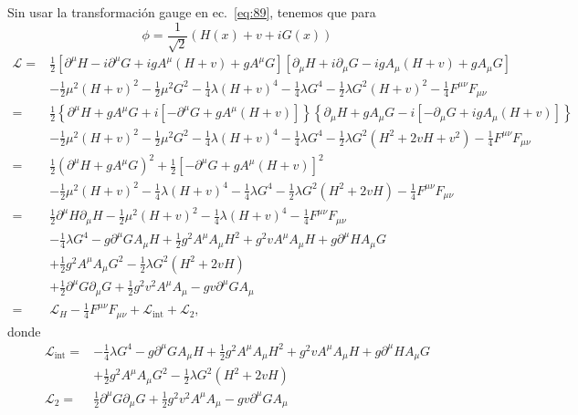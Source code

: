 Sin usar la transformaci\'on gauge en ec.~\eqref{eq:89}, tenemos que para
\begin{equation}
  \phi=\frac{1}{\sqrt{2}}\left(H(x)+v+iG(x)\right)
\end{equation}
\begin{align}
  \mathcal{L}=&\tfrac{1}{2}\left[\partial^\mu H-i\partial^\mu G+igA^\mu(H+v)+gA^\mu G\right]\left[\partial_\mu H+i\partial_\mu G-igA_\mu(H+v)+gA_\mu G\right]\nonumber\\
&-\tfrac{1}{2}\mu^2(H+v)^2-\tfrac{1}{2}\mu^2G^2-\tfrac{1}{4}\lambda(H+v)^4-\tfrac{1}{4}\lambda G^4-\tfrac{1}{2}\lambda G^2(H+v)^2-\tfrac{1}{4}F^{\mu\nu}F_{\mu\nu}\nonumber\\
=&\tfrac{1}{2}\left\{\partial^\mu H+gA^\mu G+i\left[-\partial^\mu G+gA^\mu(H+v)\right]\right\}\left\{\partial_\mu H+gA_\mu G-i\left[-\partial_\mu G+igA_\mu(H+v)\right]\right\}\nonumber\\
&-\tfrac{1}{2}\mu^2(H+v)^2-\tfrac{1}{2}\mu^2G^2-\tfrac{1}{4}\lambda(H+v)^4-\tfrac{1}{4}\lambda G^4-\tfrac{1}{2}\lambda G^2(H^2+2vH+v^2)-\tfrac{1}{4}F^{\mu\nu}F_{\mu\nu}\nonumber\\
=&\tfrac{1}{2}\left(\partial^\mu H+gA^\mu G\right)^2+\tfrac{1}{2}\left[-\partial^\mu G+gA^\mu(H+v)\right]^2\nonumber\\
&-\tfrac{1}{2}\mu^2(H+v)^2-\tfrac{1}{4}\lambda(H+v)^4-\tfrac{1}{4}\lambda G^4-\tfrac{1}{2}\lambda G^2(H^2+2vH)-\tfrac{1}{4}F^{\mu\nu}F_{\mu\nu}\nonumber\\
=&\tfrac{1}{2}\partial^\mu H\partial_\mu H-\tfrac{1}{2}\mu^2(H+v)^2-\tfrac{1}{4}\lambda(H+v)^4-\tfrac{1}{4}F^{\mu\nu}F_{\mu\nu}\nonumber\\
&-\tfrac{1}{4}\lambda G^4-g\partial^\mu GA_\mu H+\tfrac{1}{2}g^2A^\mu A_\mu H^2+g^2vA^\mu A_\mu H+g\partial^\mu HA_\mu G\nonumber\\
&+\tfrac{1}{2}g^2A^\mu A_\mu G^2-\tfrac{1}{2}\lambda G^2(H^2+2vH)\nonumber\\
&+\tfrac{1}{2}\partial^\mu G\partial_\mu G+\tfrac{1}{2}g^2v^2A^\mu A_\mu-gv\partial^\mu GA_\mu\nonumber\\
=&\mathcal{L}_H-\tfrac{1}{4}F^{\mu\nu}F_{\mu\nu}+\mathcal{L}_{\text{int}}+\mathcal{L}_2,
\end{align}
donde
\begin{align}
\mathcal{L}_{\text{int}}=&-\tfrac{1}{4}\lambda G^4-g\partial^\mu GA_\mu H+\tfrac{1}{2}g^2A^\mu A_\mu H^2+g^2vA^\mu A_\mu H+g\partial^\mu HA_\mu G\nonumber\\
&+\tfrac{1}{2}g^2A^\mu A_\mu G^2-\tfrac{1}{2}\lambda G^2(H^2+2vH)\nonumber\\
\mathcal{L}_2=&\tfrac{1}{2}\partial^\mu G\partial_\mu G+\tfrac{1}{2}g^2v^2A^\mu A_\mu-gv\partial^\mu GA_\mu
\end{align}
